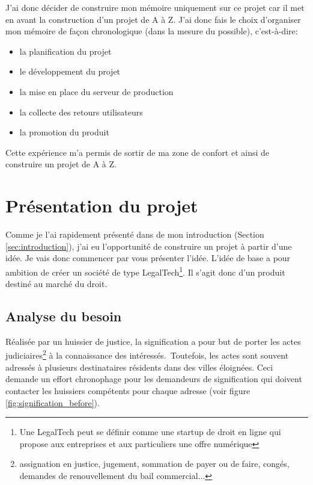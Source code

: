 \documentclass[]{report}
\begin{document}
    J'ai donc décider de construire mon mémoire uniquement sur ce projet car il met en avant la construction d'un projet de A à Z. J'ai donc fais le choix d'organiser mon mémoire de façon chronologique (dans la mesure du possible), c'est-à-dire:

    \begin{itemize}
      \item la planification du projet
      \item le développement du projet
      \item la mise en place du serveur de production
      \item la collecte des retours utilisateurs
      \item la promotion du produit
    \end{itemize}

    Cette expérience  m'a permis de sortir de ma zone de confort et ainsi de construire un projet de A à Z.

\chapter{Présentation du projet}

  Comme je l'ai rapidement présenté dans de mon introduction (Section \ref{sec:introduction}), j'ai eu l'opportunité de construire un projet à partir d'une idée. Je vais donc commencer par vous présenter l'idée. L'idée de base a pour ambition de créer un société de type LegalTech\footnote{Une LegalTech peut se définir comme une startup de droit en ligne qui propose aux entreprises et aux particuliers une offre numérique}. Il s'agit donc d'un produit destiné au marché du droit.

  \section{Analyse du besoin}

    Réalisée par un huissier de justice, la signification a pour but de porter les actes judiciaires\footnote{assignation en justice, jugement, sommation de payer ou de faire, congés, demandes de renouvellement du bail commercial...} à la connaissance des intéressés. Toutefois, les actes sont souvent adressés à plusieurs destinataires résidents dans des villes éloignées. Ceci demande un effort chronophage pour les demandeurs de signification qui doivent contacter les huissiers compétents pour chaque adresse (voir figure \ref{fig:signification_before}).
\end{document}
